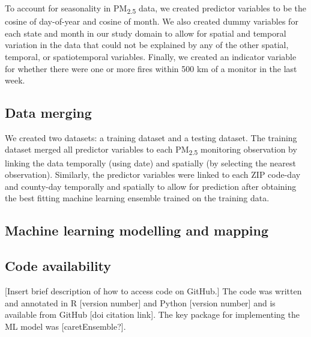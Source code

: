 \documentclass[english]{article}
\begin{document}
To account for seasonality in PM\textsubscript{2.5} data, we created predictor variables to be the cosine of day-of-year and cosine of month. We also created dummy variables for each state and month in our study domain to allow for spatial and temporal variation in the data that could not be explained by any of the other spatial, temporal, or spatiotemporal variables. Finally, we created an indicator variable for whether there were one or more fires within 500 km of a monitor in the last week. 


\subsection*{Data merging}
We created two datasets: a training dataset and a testing dataset. The training dataset merged all predictor variables to each PM\textsubscript{2.5} monitoring observation by linking the data temporally (using date) and spatially (by selecting the nearest observation). Similarly, the predictor variables were linked to each ZIP code-day and county-day temporally and spatially to allow for prediction after obtaining the best fitting machine learning ensemble trained on the training data. 

\subsection*{Machine learning modelling and mapping}


\subsection*{Code availability}


[Insert brief description of how to access code on GitHub.] The code was written and annotated in R [version number] and Python [version number] and is available from GitHub [doi citation link]. The key package for implementing the ML model was [caretEnsemble?]. 
\end{document}
